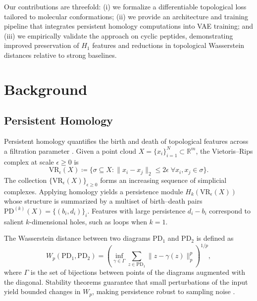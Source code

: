 \documentclass[11pt]{article}
\begin{document}
Our contributions are threefold: (i) we formalize a differentiable topological loss tailored to molecular conformations; (ii) we provide an architecture and training pipeline that integrates persistent homology computations into VAE training; and (iii) we empirically validate the approach on cyclic peptides, demonstrating improved preservation of $H_1$ features and reductions in topological Wasserstein distances relative to strong baselines.

\section{Background}
\subsection{Persistent Homology}
Persistent homology quantifies the birth and death of topological features across a filtration parameter \cite{edelsbrunner2010computational, carlsson2009topology}. Given a point cloud $X = \{x_i\}_{i=1}^N \subset \mathbb{R}^m$, the Vietoris--Rips complex at scale $\epsilon \geq 0$ is
\begin{equation}
    \mathrm{VR}_\epsilon(X) \coloneqq \big\{ \sigma \subseteq X : \|x_i - x_j\|_2 \leq 2\epsilon \; \forall x_i, x_j \in \sigma \big\}.
    \label{eq:vietoris-rips}
\end{equation}
The collection $\big\{ \mathrm{VR}_\epsilon(X) \big\}_{\epsilon \geq 0}$ forms an increasing sequence of simplicial complexes. Applying homology yields a persistence module $H_k(\mathrm{VR}_\epsilon(X))$ whose structure is summarized by a multiset of birth--death pairs $\mathrm{PD}^{(k)}(X) = \{(b_i, d_i)\}_{i}$. Features with large persistence $d_i - b_i$ correspond to salient $k$-dimensional holes, such as loops when $k=1$.

The Wasserstein distance between two diagrams $\mathrm{PD}_1$ and $\mathrm{PD}_2$ is defined as
\begin{equation}
    W_p(\mathrm{PD}_1, \mathrm{PD}_2) = \left( \inf_{\gamma \in \Gamma} \sum_{z \in \mathrm{PD}_1} \| z - \gamma(z) \|_p^p \right)^{1/p},
    \label{eq:wasserstein}
\end{equation}
where $\Gamma$ is the set of bijections between points of the diagrams augmented with the diagonal. Stability theorems guarantee that small perturbations of the input yield bounded changes in $W_p$, making persistence robust to sampling noise \cite{cohen2007stability, chazal2016structure}.
\end{document}
